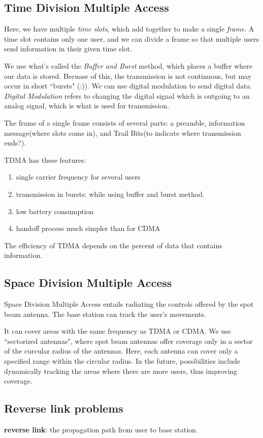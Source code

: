 \documentclass{article}
\begin{document}
\subsection{Time Division Multiple Access}
Here, we have multiple \textit{time slots}, which add together to make a single \textit{frame}. A time slot 
contains only one user, and we can divide a frame so that multiple users send information in their given 
time slot.

We use what's called the \textit{Buffer and Burst } method, which places a buffer where our data is stored.
Becuase of this, the transmission is not continuous, but may occur in short ``bursts" (:)). We can use
digital modulation to send digital data. \textit{Digital Modulation} refers to changing the digital signal
which is outgoing to an analog signal, which is what is used for transmission.

The frame of a single frame consists of several parts: a preamble, information message(where slots come in), and
Trail Bits(to indicate where transmission ends?).

TDMA has these features:
\begin{enumerate}
		\item{single carrier frequency for several users}
		\item{transmission in bursts}: while using buffer and burst method.
		\item{low battery consumption}
		\item{handoff process much simpler than for CDMA}
\end{enumerate}
The efficiency of TDMA depends on the percent of data that contains information.
\subsection{Space Division Multiple Access}
Space Division Multiple Access entails radiating the controls offered by the spot beam antenna. The base 
station can track the user's movements.

It can cover areas with the same frequency as TDMA or CDMA. We use ``sectorized antennas", where spot beam
antennas offer coverage only in a sector of the curcular radius of the antennas. Here, each antenna
can cover only a specified range within the circular radius.  In the future, possibilities include 
dynamically tracking the areas where there are more users, thus improving coverage. 

\subsection{Reverse link problems}
\textbf{reverse link}: the propagation path from user to base station.
\end{document}
